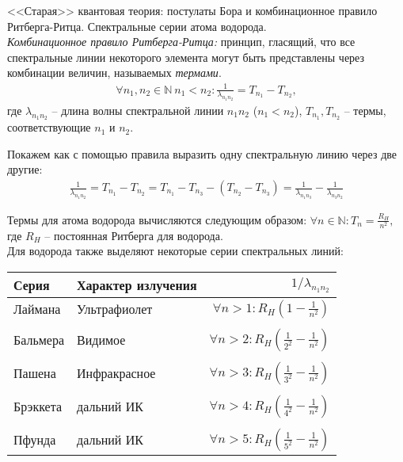 \documentclass[__main__.tex]{subfiles}
\begin{document}
<<Старая>> квантовая теория: постулаты Бора и комбинационное правило Ритберга-Ритца. Спектральные серии атома водорода.\\ 

\textit{Комбинационное правило Ритберга-Ритца:} принцип, гласящий, что все спектральные линии некоторого элемента могут быть представлены через комбинации величин, называемых \textit{термами}.
\begin{gather*}
	\forall n_1,n_2\in\mathbb{N} \ n_1 < n_2 \colon \frac{1}{\lambda_{n_1 n_2}} = T_{n_1} - T_{n_2},
\end{gather*}
где $\lambda_{n_1 n_2}$ -- длина волны спектральной линии $n_1 n_2$ ($n_1<n_2$), $T_{n_1}, T_{n_2}$ -- термы, соответствующие $n_1$ и $n_2$.

Покажем как с помощью правила выразить одну спектральную линию через две другие:
\begin{gather*}
	\frac{1}{\lambda_{n_1 n_2}}
	=
	T_{n_1} - T_{n_2}
	=
	T_{n_1}-T_{n_3} - (T_{n_2}-T_{n_3})
	=
	\frac{1}{\lambda_{n_1 n_3}} - \frac{1}{\lambda_{n_3 n_2}}
\end{gather*}

Термы для атома водорода вычисляются следующим образом:
$
\forall n\in\mathbb{N}\colon T_n = \frac{R_H}{n^2},
$
где $R_H$ -- постоянная Ритберга для водорода.\\
Для водорода также выделяют некоторые серии спектральных линий:
\begin{table}[h]
\centering
\begin{tabular}{llr}
\toprule
Серия & Характер излучения & $1/\lambda_{n_1 n_2}$ \\
\midrule
Лаймана & Ультрафиолет & $\forall n>1\colon R_{H}\left(1-\frac{1}{n^2}\right)$ \\
& & \\
Бальмера & Видимое & $\forall n>2\colon R_{H}\left(\frac{1}{2^2}-\frac{1}{n^2}\right)$ \\
& & \\
Пашена & Инфракрасное & $\forall n>3\colon R_{H}\left(\frac{1}{3^2}-\frac{1}{n^2}\right)$ \\
& & \\
Брэккета & дальний ИК & $\forall n>4\colon R_{H}\left(\frac{1}{4^2}-\frac{1}{n^2}\right)$ \\
& & \\
Пфунда & дальний ИК & $\forall n>5\colon R_{H}\left(\frac{1}{5^2}-\frac{1}{n^2}\right)$ \\
\bottomrule
\end{tabular}
\end{table}
\end{document}
